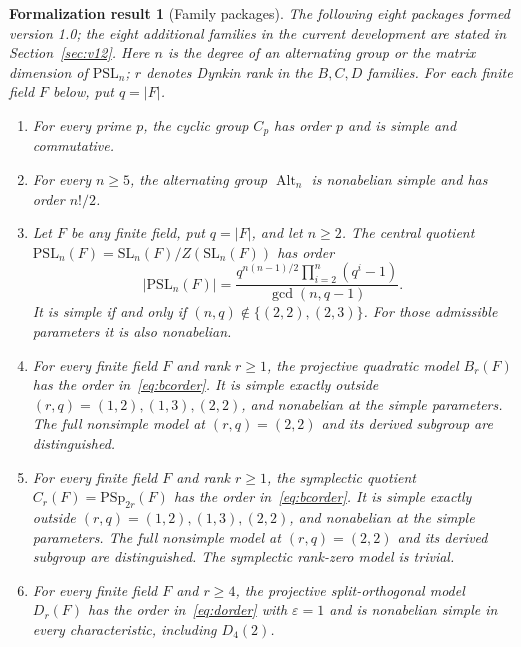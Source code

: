 \documentclass[11pt]{article}
\numberwithin{equation}{section}
\newtheorem{formalization}[theorem]{Formalization result}
\theoremstyle{definition}
\newcommand{\SL}{\mathrm{SL}}
\newcommand{\PSL}{\mathrm{PSL}}
\newcommand{\PSp}{\mathrm{PSp}}
\newcommand{\Alt}{\operatorname{Alt}}
\begin{document}
\begin{formalization}[Family packages]\label{thm:families}
The following eight packages formed version 1.0; the eight additional families in the current development are stated in Section~\ref{sec:v12}. Here $n$ is the degree of
an alternating group or the matrix dimension of $\PSL_n$; $r$ denotes
Dynkin rank in the $B,C,D$ families.
For each finite field $F$ below, put $q=|F|$.
\begin{enumerate}[label=\textup{(\roman*)}]
\item For every prime $p$, the cyclic group $C_p$ has order $p$ and is
simple and commutative.
\item For every $n\geq5$, the alternating group $\Alt_n$ is nonabelian
simple and has order $n!/2$.
\item Let $F$ be any finite field, put $q=|F|$, and let $n\geq2$.
The central quotient
$\PSL_n(F)=\SL_n(F)/Z(\SL_n(F))$ has order
\begin{equation}\label{eq:pslorder}
 |\PSL_n(F)|=
 \frac{q^{n(n-1)/2}\prod_{i=2}^{n}(q^i-1)}{\gcd(n,q-1)}.
\end{equation}
It is simple if and only if
$(n,q)\notin\{(2,2),(2,3)\}$. For those admissible parameters it is
also nonabelian.
\item For every finite field $F$ and rank $r\geq1$, the projective
quadratic model $B_r(F)$ has the order in~\eqref{eq:bcorder}.
It is simple exactly outside $(r,q)=(1,2),(1,3),(2,2)$, and
nonabelian at the simple parameters. The full nonsimple model at
$(r,q)=(2,2)$ and its derived subgroup are distinguished.
\item For every finite field $F$ and rank $r\geq1$, the symplectic
quotient $C_r(F)=\PSp_{2r}(F)$ has the order in~\eqref{eq:bcorder}.
It is simple exactly outside $(r,q)=(1,2),(1,3),(2,2)$, and
nonabelian at the simple parameters. The full nonsimple model at
$(r,q)=(2,2)$ and its derived subgroup are distinguished. The
symplectic rank-zero model is trivial.
\item For every finite field $F$ and $r\geq4$, the projective
split-orthogonal model $D_r(F)$ has the order in~\eqref{eq:dorder}
with $\varepsilon=1$ and is nonabelian simple in every characteristic,
including $D_4(2)$.


\end{enumerate}
\end{formalization}
\end{document}
